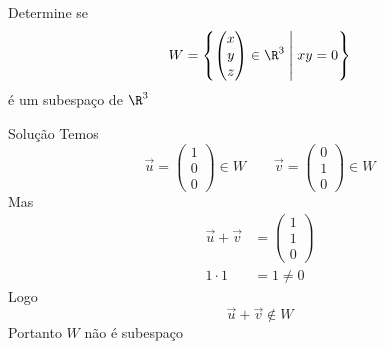 \begin{question}
  Determine se
  \[
  W=
  \left\{
  \begin{pmatrix}
  x\\y\\z
  \end{pmatrix}
  \in\R^{3}
  \;\middle|\;
  xy=0
  \right\}
  \]
  é um subespaço de $\R^{3}$
\end{question}

\begin{resolution}{Solução}
  Temos
  \[
  \vec{u}=
  \begin{pmatrix}
  1\\0\\0
  \end{pmatrix}
  \in W
  \qquad
  \vec{v}=
  \begin{pmatrix}
  0\\1\\0
  \end{pmatrix}
  \in W
  \]
  Mas
  \begin{align*}
  \vec{u}+\vec{v}
  &=
  \begin{pmatrix}
  1\\1\\0
  \end{pmatrix}\\
  1\cdot1&=1\neq0
  \end{align*}
  Logo
  \[
  \vec{u}+\vec{v}\notin W
  \]
  Portanto $W$ não é subespaço
\end{resolution}

\endinput
